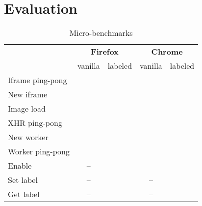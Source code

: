 \section{Evaluation}
\label{sec:eval}

\begin{table}
\centering
\begin{tabular}{l |c|c|c|c }
\toprule
                   & \multicolumn{2}{c}{\textbf{Firefox}}
                   & \multicolumn{2}{c}{\textbf{Chrome}} \\
                   & vanilla & labeled  & vanilla & labeled
\\\midrule%
Iframe ping-pong   &         &          &         &
\\\hline%
New iframe         &         &          &         &
\\\hline%
Image load         &         &          &         &
\\\hline%
XHR ping-pong      &         &          &         &
\\\hline%
New worker         &         &          &         &
\\\hline%
Worker ping-pong   &         &          &         &
\\\hline%
Enable             &  --     &          &         &
\\\hline%
Set label          &  --     &          &   --    &
\\\hline%
Get label          &  --     &          &   --    &
\\\bottomrule
\end{tabular}
\caption{\label{microbench} Micro-benchmarks}
\end{table}
